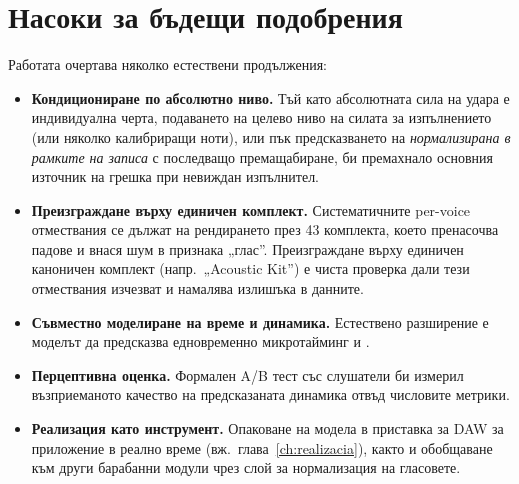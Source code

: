 \section{Насоки за бъдещи подобрения}
\label{sec:budeshti}

Работата очертава няколко естествени продължения:
\begin{itemize}
  \item \textbf{Кондициониране по абсолютно ниво.} Тъй като абсолютната сила на
        удара е индивидуална черта, подаването на целево ниво на силата за
        изпълнението (или няколко калибриращи ноти), или пък предсказването на
        \emph{нормализирана в рамките на записа}  с последващо
        премащабиране, би премахнало основния източник на грешка при невиждан
        изпълнител.
  \item \textbf{Преизграждане върху единичен комплект.} Систематичните per-voice
        отмествания се дължат на рендирането през 43 комплекта, което пренасочва
        падове и внася шум в признака „глас''. Преизграждане върху единичен
        каноничен комплект (напр.\ „Acoustic Kit'') е чиста проверка дали тези
        отмествания изчезват и намалява излишъка в данните.
  \item \textbf{Съвместно моделиране на време и динамика.} Естествено разширение е
        моделът да предсказва едновременно микротайминг и .
  \item \textbf{Перцептивна оценка.} Формален A/B тест със слушатели би измерил
        възприеманото качество на предсказаната динамика отвъд числовите метрики.
  \item \textbf{Реализация като инструмент.} Опаковане на модела в приставка за
        DAW за приложение в реално време (вж.\ глава~\ref{ch:realizacia}), както и
        обобщаване към други барабанни модули чрез слой за нормализация на
        гласовете.
\end{itemize}
